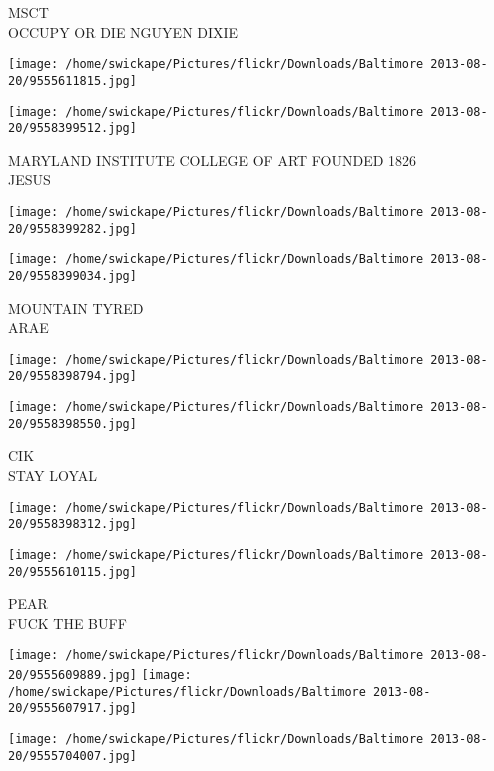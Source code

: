 \documentclass[10pt,letterpaper]{article}
\begin{document}
MSCT\\
OCCUPY OR DIE NGUYEN DIXIE\\
\pagebreak

\texttt{[image: /home/swickape/Pictures/flickr/Downloads/Baltimore 2013-08-20/9555611815.jpg]}

\vspace{0.25in}
\texttt{[image: /home/swickape/Pictures/flickr/Downloads/Baltimore 2013-08-20/9558399512.jpg]}

MARYLAND INSTITUTE COLLEGE OF ART FOUNDED 1826\\
JESUS\\
\pagebreak

\texttt{[image: /home/swickape/Pictures/flickr/Downloads/Baltimore 2013-08-20/9558399282.jpg]}

\vspace{0.25in}
\texttt{[image: /home/swickape/Pictures/flickr/Downloads/Baltimore 2013-08-20/9558399034.jpg]}

MOUNTAIN TYRED\\
ARAE\\
\pagebreak

\texttt{[image: /home/swickape/Pictures/flickr/Downloads/Baltimore 2013-08-20/9558398794.jpg]}

\vspace{0.25in}
\texttt{[image: /home/swickape/Pictures/flickr/Downloads/Baltimore 2013-08-20/9558398550.jpg]}

CIK\\
STAY LOYAL\\
\pagebreak

\texttt{[image: /home/swickape/Pictures/flickr/Downloads/Baltimore 2013-08-20/9558398312.jpg]}

\vspace{0.25in}
\texttt{[image: /home/swickape/Pictures/flickr/Downloads/Baltimore 2013-08-20/9555610115.jpg]}

PEAR\\
FUCK THE BUFF\\
\pagebreak

\texttt{[image: /home/swickape/Pictures/flickr/Downloads/Baltimore 2013-08-20/9555609889.jpg]}
\texttt{[image: /home/swickape/Pictures/flickr/Downloads/Baltimore 2013-08-20/9555607917.jpg]}

\texttt{[image: /home/swickape/Pictures/flickr/Downloads/Baltimore 2013-08-20/9555704007.jpg]}
\end{document}
